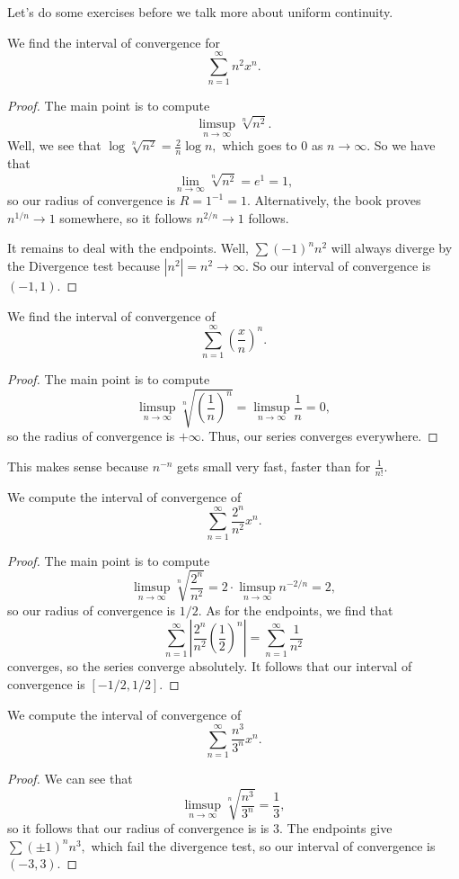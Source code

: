 \documentclass[../notes.tex]{subfiles}
\begin{document}
Let's do some exercises before we talk more about uniform continuity.
\begin{exe}
	We find the interval of convergence for
	\[\sum_{n=1}^\infty n^2x^n.\]
\end{exe}
\begin{proof}
	The main point is to compute
	\[\limsup_{n\to\infty}\sqrt[n]{n^2}.\]
	Well, we see that $\log\sqrt[n]{n^2}=\frac2n\log n,$ which goes to $0$ as $n\to\infty.$ So we have that
	\[\lim_{n\to\infty}\sqrt[n]{n^2}=e^1=1,\]
	so our radius of convergence is $R=1^{-1}=1.$ Alternatively, the book proves $n^{1/n}\to1$ somewhere, so it follows $n^{2/n}\to1$ follows.

	It remains to deal with the endpoints. Well, $\sum(-1)^nn^2$ will always diverge by the Divergence test because $\left|n^2\right|=n^2\to\infty.$ So our interval of convergence is $\boxed{(-1,1)}.$
\end{proof}
\begin{exercise}
	We find the interval of convergence of
	\[\sum_{n=1}^\infty\left(\frac xn\right)^n.\]
\end{exercise}
\begin{proof}
	The main point is to compute
	\[\limsup_{n\to\infty}\sqrt[n]{\left(\frac1n\right)^n}=\limsup_{n\to\infty}\frac1n=0,\]
	so the radius of convergence is $+\infty.$ Thus, our series converges $\boxed{\text{everywhere}}.$
\end{proof}
\begin{remark}
	This makes sense because $n^{-n}$ gets small very fast, faster than for $\frac1{n!}.$
\end{remark}
\begin{exercise}
	We compute the interval of convergence of
	\[\sum_{n=1}^\infty\frac{2^n}{n^2}x^n.\]
\end{exercise}
\begin{proof}
	The main point is to compute
	\[\limsup_{n\to\infty}\sqrt[n]{\frac{2^n}{n^2}}=2\cdot\limsup_{n\to\infty}n^{-2/n}=2,\]
	so our radius of convergence is $1/2.$ As for the endpoints, we find that
	\[\sum_{n=1}^\infty\left|\frac{2^n}{n^2}\left(\frac12\right)^n\right|=\sum_{n=1}^\infty\frac1{n^2}\]
	converges, so the series converge absolutely. It follows that our interval of convergence is $\boxed{[-1/2,1/2]}.$
\end{proof}
\begin{exe}
	We compute the interval of convergence of
	\[\sum_{n=1}^\infty\frac{n^3}{3^n}x^n.\]
\end{exe}
\begin{proof}
	We can see that
	\[\limsup_{n\to\infty}\sqrt[n]{\frac{n^3}{3^n}}=\frac13,\]
	so it follows that our radius of convergence is is $3.$ The endpoints give $\sum(\pm1)^nn^3,$ which fail the divergence test, so our interval of convergence is $\boxed{(-3,3)}.$
\end{proof}
\end{document}
